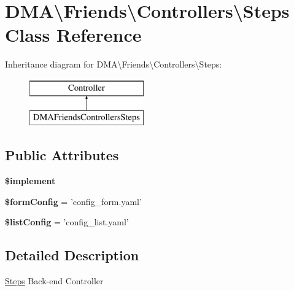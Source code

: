 \hypertarget{classDMA_1_1Friends_1_1Controllers_1_1Steps}{\section{D\+M\+A\textbackslash{}Friends\textbackslash{}Controllers\textbackslash{}Steps Class Reference}
\label{classDMA_1_1Friends_1_1Controllers_1_1Steps}
}
Inheritance diagram for D\+M\+A\textbackslash{}Friends\textbackslash{}Controllers\textbackslash{}Steps\+:\begin{figure}[H]
\begin{center}
\leavevmode
\includegraphics[height=2.000000cm]{d0/d0f/classDMA_1_1Friends_1_1Controllers_1_1Steps}
\end{center}
\end{figure}
\subsection*{Public Attributes}
\begin{DoxyCompactItemize}
\item 
{\bfseries \$implement}
\item 
\hypertarget{classDMA_1_1Friends_1_1Controllers_1_1Steps_acff6d45609493bcf45f46cbef4278190}{{\bfseries \$form\+Config} = 'config\+\_\+form.\+yaml'}\label{classDMA_1_1Friends_1_1Controllers_1_1Steps_acff6d45609493bcf45f46cbef4278190}

\item 
\hypertarget{classDMA_1_1Friends_1_1Controllers_1_1Steps_a1ff81739bf6107eccb4b3885aa6f7008}{{\bfseries \$list\+Config} = 'config\+\_\+list.\+yaml'}\label{classDMA_1_1Friends_1_1Controllers_1_1Steps_a1ff81739bf6107eccb4b3885aa6f7008}

\end{DoxyCompactItemize}


\subsection{Detailed Description}
\hyperlink{classDMA_1_1Friends_1_1Controllers_1_1Steps}{Steps} Back-\/end Controller 

